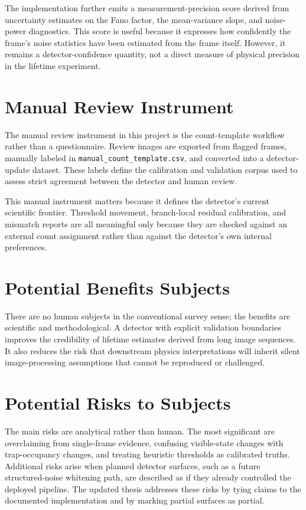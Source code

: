 \documentclass[12pt]{report}
\begin{document}
The implementation further emits a measurement-precision score derived from uncertainty estimates on the Fano factor, the mean-variance slope, and noise-power diagnostics. This score is useful because it expresses how confidently the frame's noise statistics have been estimated from the frame itself. However, it remains a detector-confidence quantity, not a direct measure of physical precision in the lifetime experiment.

\section{Manual Review Instrument}

The manual review instrument in this project is the count-template workflow rather than a questionnaire. Review images are exported from flagged frames, manually labeled in \texttt{manual\_count\_template.csv}, and converted into a detector-update dataset. These labels define the calibration and validation corpus used to assess strict agreement between the detector and human review.

This manual instrument matters because it defines the detector's current scientific frontier. Threshold movement, branch-local residual calibration, and mismatch reports are all meaningful only because they are checked against an external count assignment rather than against the detector's own internal preferences.

\section{Potential Benefits Subjects}

There are no human subjects in the conventional survey sense; the benefits are scientific and methodological. A detector with explicit validation boundaries improves the credibility of lifetime estimates derived from long image sequences. It also reduces the risk that downstream physics interpretations will inherit silent image-processing assumptions that cannot be reproduced or challenged.

\section{Potential Risks to Subjects}

The main risks are analytical rather than human. The most significant are overclaiming from single-frame evidence, confusing visible-state changes with trap-occupancy changes, and treating heuristic thresholds as calibrated truths. Additional risks arise when planned detector surfaces, such as a future structured-noise whitening path, are described as if they already controlled the deployed pipeline. The updated thesis addresses these risks by tying claims to the documented implementation and by marking partial surfaces as partial.
\end{document}
